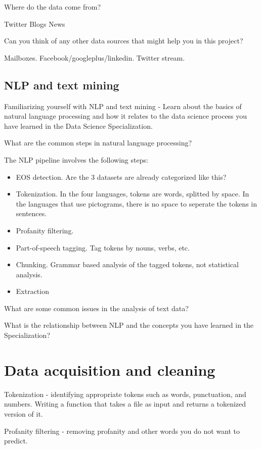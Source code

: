 \documentclass{article}
\begin{document}
Where do the data come from?

Twitter
Blogs
News

Can you think of any other data sources that might help you in this project?

Mailboxes.
Facebook/googleplus/linkedin.
Twitter stream.


\subsection{NLP and text mining}


Familiarizing yourself with NLP and text mining - Learn about the basics of natural language processing and how it relates to the data science process you have learned in the Data Science Specialization.


What are the common steps in natural language processing?

The NLP pipeline involves the following steps:

\begin{itemize}
  \item EOS detection. Are the 3 datasets are already categorized like this?
  \item Tokenization. In the four languages, tokens are words, splitted by space. In the languages that use pictograms, there is no space to seperate the tokens in sentences.
  \item Profanity filtering. 
  \item Part-of-speech tagging. Tag tokens by nouns, verbs, etc.
  \item Chunking. Grammar based analysis of the tagged tokens, not statistical analysis.
  \item Extraction
\end{itemize}


What are some common issues in the analysis of text data?



What is the relationship between NLP and the concepts you have learned in the Specialization?


\section{Data acquisition and cleaning}

Tokenization - identifying appropriate tokens such as words, punctuation, and numbers. Writing a function that takes a file as input and returns a tokenized version of it.

Profanity filtering - removing profanity and other words you do not want to predict.
\end{document}
